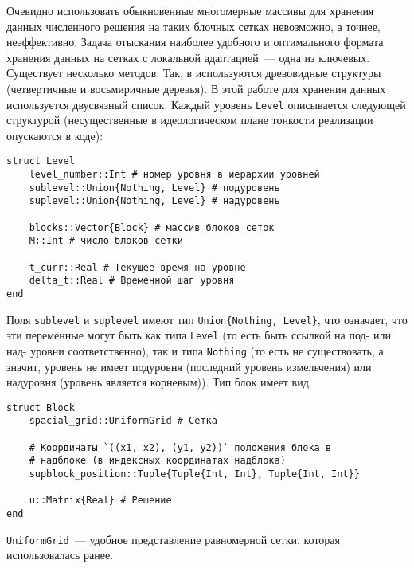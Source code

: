 Очевидно использовать обыкновенные многомерные массивы для хранения данных численного решения на таких блочных сетках невозможно, а точнее, неэффективно.
Задача отыскания наиболее удобного и оптимального формата хранения данных на сетках с локальной адаптацией~--- одна из ключевых.
Существует несколько методов.
Так, в \cite{АфендиковЛАД} используются древовидные структуры (четвертичные и восьмиричные деревья).
В этой работе для хранения данных используется двусвязный список.
Каждый уровень \texttt{Level} описывается следующей структурой (несущественные в идеологическом плане тонкости реализации опускаются в коде):
\begin{verbatim}
struct Level
    level_number::Int # номер уровня в иерархии уровней
    sublevel::Union{Nothing, Level} # подуровень
    suplevel::Union{Nothing, Level} # надуровень

    blocks::Vector{Block} # массив блоков сеток
    M::Int # число блоков сетки

    t_curr::Real # Текущее время на уровне
    delta_t::Real # Временной шаг уровня
end
\end{verbatim}
Поля \texttt{sublevel} и \texttt{suplevel} имеют тип \texttt{Union\{Nothing, Level\}}, что означает, что эти переменные могут быть как типа \texttt{Level} (то есть быть ссылкой на под- или над- уровни соответственно), так и типа \texttt{Nothing} (то есть не существовать, а значит, уровень не имеет подуровня (последний уровень измельчения) или надуровня (уровень является корневым)).
Тип блок имеет вид:
\begin{verbatim}
struct Block
    spacial_grid::UniformGrid # Сетка

    # Координаты `((x1, x2), (y1, y2))` положения блока в
    # надблоке (в индексных координатах надблока)
    supblock_position::Tuple{Tuple{Int, Int}, Tuple{Int, Int}}
    
    u::Matrix{Real} # Решение
end
\end{verbatim}
\texttt{UniformGrid}~--- удобное представление равномерной сетки, которая использовалась ранее.